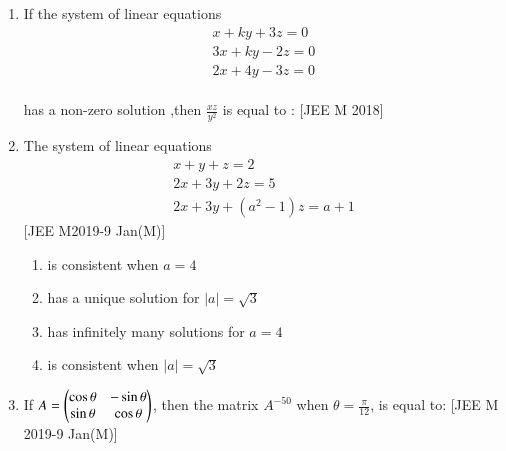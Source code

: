 \documentclass[journal,,12pt,twocolumn]{IEEEtran}
\theoremstyle{remark}
\begin{document}
\begin{enumerate}
\begin{enumerate}
\end{enumerate}
\item If the system of linear equations \\
\begin{align*}x+ky+3z=0 \\
3x+ky-2z=0 \\
2x+4y-3z=0 \end{align*}\\
has a non-zero solution ,then $\frac{xz}{y^2}$ is equal to :
\hfill{[JEE M 2018]}
\begin{enumerate}
\end{enumerate}
\item The system of linear equations \\
\begin{align*}x+y+z=2 \\
2x+3y+2z=5 \\
2x+3y+(a^2-1)z=a+1 \end{align*} 
\hfill{[JEE M2019-9 Jan(M)]}
\begin{enumerate}[label=\alph*)]
    \item is consistent when $a=4$
    \item has a unique solution for $|a|= \sqrt{3}$
    \item has infinitely many solutions for $a=4$
    \item is consistent when $|a|= \sqrt{3}$
\end{enumerate}
\item If $A= \begin{pmatrix}
    \cos{\theta} & -\sin{\theta} \\
    \sin{\theta} & \cos{\theta}
\end{pmatrix}$, then the matrix $A^{-50}$ when $\theta=\frac{\pi}{12}$, is equal to: 
\hfill{[JEE M 2019-9 Jan(M)]}
\begin{enumerate}
\begin{multicols}{2}


\end{multicols}
\end{enumerate}
\end{enumerate}
\end{document}
